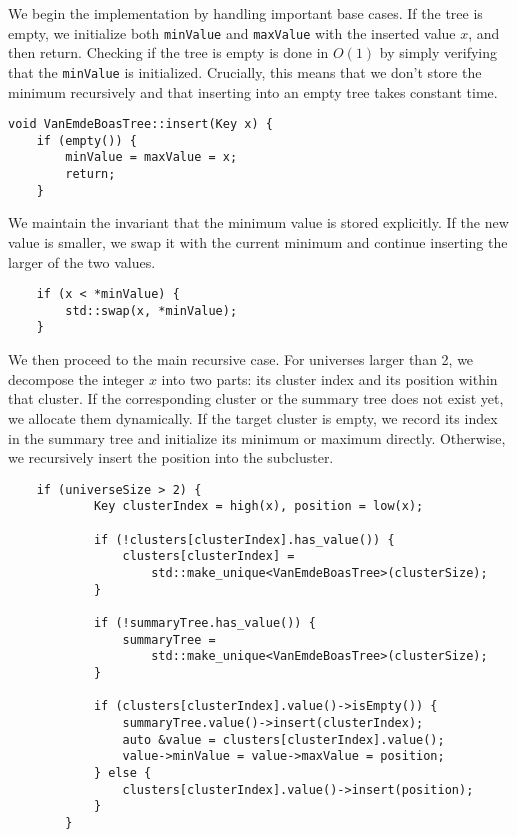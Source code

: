 We begin the implementation by handling important base cases. If the tree is empty, we initialize both \texttt{minValue} and \texttt{maxValue} with the inserted value \( x \), and then return. Checking if the tree is empty is done in \(O(1)\) by simply verifying that the \texttt{minValue} is initialized. Crucially, this means that we don't store the minimum recursively and that inserting into an empty tree takes constant time.

\begin{verbatim}
void VanEmdeBoasTree::insert(Key x) {
    if (empty()) {
        minValue = maxValue = x;
        return;
    }
\end{verbatim}

We maintain the invariant that the minimum value is stored explicitly. If the new value is smaller, we swap it with the current minimum and continue inserting the larger of the two values.

\begin{verbatim}
    if (x < *minValue) {
        std::swap(x, *minValue);
    }
\end{verbatim}

We then proceed to the main recursive case. For universes larger than 2, we decompose the integer \( x \) into two parts: its cluster index and its position within that cluster. If the corresponding cluster or the summary tree does not exist yet, we allocate them dynamically. If the target cluster is empty, we record its index in the summary tree and initialize its minimum or maximum directly. Otherwise, we recursively insert the position into the subcluster.

\begin{verbatim}
    if (universeSize > 2) {
            Key clusterIndex = high(x), position = low(x);

            if (!clusters[clusterIndex].has_value()) {
                clusters[clusterIndex] = 
                    std::make_unique<VanEmdeBoasTree>(clusterSize);
            }

            if (!summaryTree.has_value()) {
                summaryTree = 
                    std::make_unique<VanEmdeBoasTree>(clusterSize);
            }

            if (clusters[clusterIndex].value()->isEmpty()) {
                summaryTree.value()->insert(clusterIndex);
                auto &value = clusters[clusterIndex].value();
                value->minValue = value->maxValue = position;
            } else {
                clusters[clusterIndex].value()->insert(position);
            }
        }
\end{verbatim}

